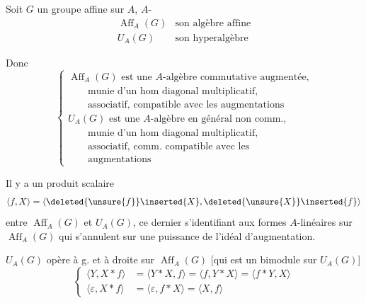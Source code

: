 Soit $G$ un  groupe affine sur $A$, $A$-
\[
\begin{array}{ll}
\operatorname{Aff}_A(G)&\text{son algèbre affine}\\[1ex]
U_A(G)&\text{son hyperalgèbre}
\end{array}
\]

Donc
\[
\left\{\begin{array}{l}
\operatorname{Aff}_A(G)\text{ est une }A\text{-algèbre commutative augmentée,}\\
\qquad\text{munie d'un hom diagonal multiplicatif,}\\
\qquad\text{associatif, compatible avec les augmentations}\\[1ex]
U_A(G)\text{ est une }A\text{-algèbre en général non comm.,}\\
\qquad\text{munie d'un hom diagonal multiplicatif,}\\
\qquad\text{associatif, comm. compatible avec les}\\
\qquad\text{augmentations}
\end{array}\right.
\]

Il y a un produit scalaire
\[
\langle f,X\rangle=\langle\deleted{\unsure{f}}\inserted{X},\deleted{\unsure{X}}\inserted{f}\rangle
\]
entre $\operatorname{Aff}_A(G)$ et $U_A(G)$, ce dernier s'identifiant aux formes $A$-linéaires sur $\operatorname{Aff}_A(G)$ qui s'annulent sur une puissance de l'idéal d'augmentation.

$U_A(G)$ opère à g. et à droite sur $\operatorname{Aff}_A(G)$ [qui est un bimodule sur $U_A(G)$]
\[
\left\{\begin{aligned}
\langle Y,X*f\rangle&=\langle Y*X,f\rangle=\langle f,Y*X\rangle=\langle f*Y,X\rangle\\
\langle\varepsilon,X*f\rangle&=\langle\varepsilon,f*X\rangle=\langle X,f\rangle
\end{aligned}\right.
\]
